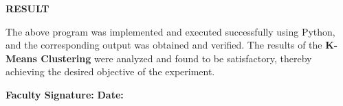 \documentclass[11pt,twoside]{article}
\newcommand{\expheading}[1]{{\fontsize{14}{17}\selectfont\textbf{#1}\par}}
\newcommand{\tooddpage}{\clearpage\ifodd\value{page}\else\null\thispagestyle{empty}\newpage\fi}
\begin{document}
\tooddpage
\expheading{RESULT}
\vspace{4pt}
{\fontsize{12}{15}\selectfont
The above program was implemented and executed successfully using Python, and the corresponding output was obtained and verified. The results of the \textbf{K-Means Clustering} were analyzed and found to be satisfactory, thereby achieving the desired objective of the experiment.\par
}

\vspace{12pt}

\noindent\textbf{Faculty Signature:} \underline{\hspace{3.6cm}} \hfill \textbf{Date:} \underline{\hspace{2.8cm}}\par

\tooddpage
\end{document}
